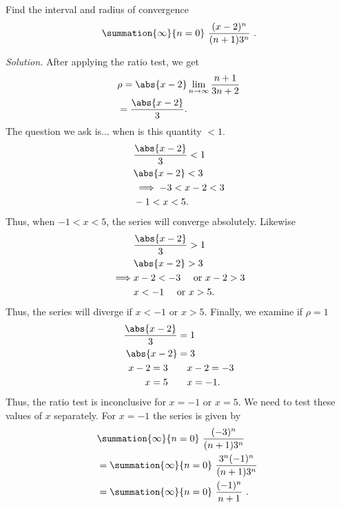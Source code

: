 \documentclass{report}
\begin{document}
    \pagebreak \bigbreak \noindent 
    \begin{exm}
        Find the interval and radius of convergence
        \begin{align*}
            \summation{\infty}{n=0}\ \frac{(x-2)^{n}}{(n+1)3^{n}}\ 
        .\end{align*}
    \end{exm}
    \bigbreak \noindent 
    \textit{Solution.} After applying the ratio test, we get
    \begin{align*}
        &\rho = \abs{x-2}\lim\limits_{n \to \infty}{\frac{n+1}{3n+2}} \\
        &=\frac{\abs{x-2}}{3}
    .\end{align*}
    \bigbreak \noindent 
    The question we ask is... when is this quantity $<1 $. 
    \begin{align*}
        &\frac{\abs{x-2}}{3} < 1 \\
        &\abs{x-2} < 3 \\
        &\implies -3 < x-2 < 3 \\
        &-1 < x < 5
    .\end{align*}
    \bigbreak \noindent 
    Thus, when $-1 < x < 5$, the series will converge absolutely. Likewise
    \begin{align*}
        &\frac{\abs{x-2}}{3} > 1 \\
        &\abs{x-2} > 3 \\
        \implies &x-2 < -3 \quad \text{ or } x-2 > 3 \\
        &x < -1 \quad \text{ or } x > 5
    .\end{align*}
    \bigbreak \noindent 
    Thus, the series will diverge if $x < -1$ or $x > 5$. Finally, we examine if $\rho = 1$
    \begin{align*}
        \frac{\abs{x-2}}{3} &= 1 \\
        \abs{x-2} &= 3 \\
        x-2 = 3 \quad &\quad x-2 = -3 \\
        x=5 \quad &\quad x=-1
    .\end{align*}
    \bigbreak \noindent 
    Thus, the ratio test is inconclusive for $x = -1$ or $x=5$. We need to test these values of $x$ separately. For $x=-1$ the series is given by
    \begin{align*}
        &\summation{\infty}{n=0}\ \frac{(-3)^{n}}{(n+1)3^{n}}\  \\
        &=\summation{\infty}{n=0}\ \frac{3^{n}(-1)^{n}}{(n+1)3^{n}}\  \\
        &=\summation{\infty}{n=0}\ \frac{(-1)^{n}}{n+1}\  
    .\end{align*}
\end{document}
